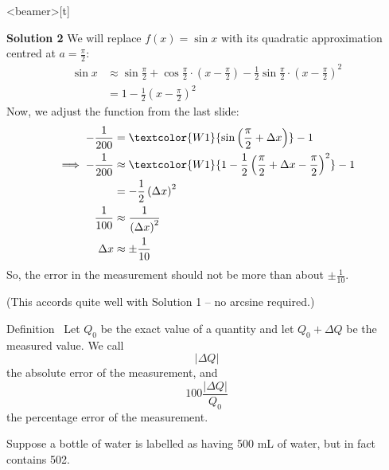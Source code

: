 \begin{frame}<beamer>[t]
\small
{}
\color{answercolor}

\textbf{Solution 2}
We will replace $f(x)=\sin x$ with its quadratic approximation centred at $a=\frac{\pi}{2}$:
\begin{align*}
 \sin x &\approx \sin\frac\pi2 + \cos\frac\pi2\cdot\left(x-\frac{\pi}{2}\right)-\frac12\sin\frac\pi2\cdot\left(x-\frac{\pi}{2}\right)^2\\
 &=1-\frac12\left(x-\frac{\pi}{2}\right)^2
\end{align*}
Now, we adjust the function from the last slide:
\begin{align*}
-\frac{1}{200}&=\textcolor{W1}{\sin \left(\frac{\pi}{2}+\Delta x\right)} - 1\\
\implies -\frac1{200}& \approx \textcolor{W1}{1-\frac12\left(\frac{\pi}{2}+\Delta x-\frac{\pi}{2}\right)^2}-1\\
&=-\frac12\left(\Delta x\right)^2\\
\frac{1}{100}&\approx\frac1{\left(\Delta x\right)^2}\\
\Delta x & \approx \pm\frac1{10}
\end{align*}
So, the error in the measurement should not be more than about $\pm \frac1{10}$.

(This accords quite well with Solution 1 -- no arcsine required.)

\end{frame}
\begin{frame}[t]
\begin{block}{Definition~}
Let $Q_0$ be the exact value of a quantity and let $Q_0+\Delta Q$ be the measured value. We call \[|\Delta Q|\]
the \alert{absolute error} of the measurement, and 
\[100\frac{|\Delta Q|}{Q_0}\]
the \alert{percentage error} of the measurement.
\end{block}\pause\vfill
\color{C1}
Suppose a bottle of water is labelled as having 500 mL of water, but in fact contains 502. \vfill

\pause\color{answercolor}
\end{frame}
